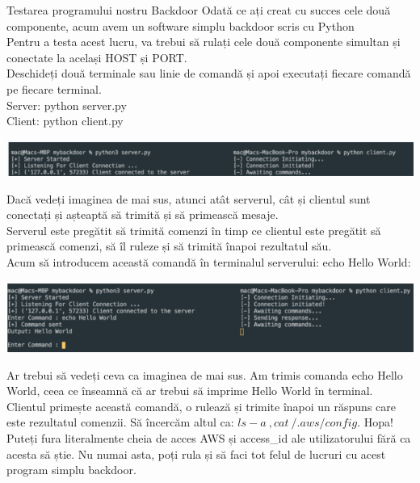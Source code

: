 \documentclass[oneside,20pt]{article}          %
\begin{document}
Testarea programului nostru Backdoor
Odată ce ați creat cu succes cele două componente, acum avem un software simplu backdoor scris cu Python\\
Pentru a testa acest lucru, va trebui să rulați cele două componente simultan și conectate la același HOST și PORT.\\
Deschideți două terminale sau linie de comandă și apoi executați fiecare comandă pe fiecare terminal.\\
Server: python server.py\\
Client: python client.py\\
  \begin{center}
\includegraphics[height=2 cm, width= 12 cm]{6.png}
\end{center}
Dacă vedeți imaginea de mai sus, atunci atât serverul, cât și clientul sunt conectați și așteaptă să trimită și să primească mesaje.\\

Serverul este pregătit să trimită comenzi în timp ce clientul este pregătit să primească comenzi, să îl ruleze și să trimită înapoi rezultatul său.\\

Acum să introducem această comandă în terminalul serverului: echo Hello World:\\
\begin{center}
\includegraphics[height=3 cm, width= 12 cm]{7.png}
\end{center}
Ar trebui să vedeți ceva ca imaginea de mai sus. Am trimis comanda echo Hello World, ceea ce înseamnă că ar trebui să imprime Hello World în terminal. Clientul primește această comandă, o rulează și trimite înapoi un răspuns care este rezultatul comenzii.
Să încercăm altul ca: $ls -a ~, cat ~/.aws/config$.
Hopa! Puteți fura literalmente cheia de acces AWS și access_id ale utilizatorului fără ca acesta să știe. Nu numai asta, poți rula și să faci tot felul de lucruri cu acest program simplu backdoor.
\end{document}
